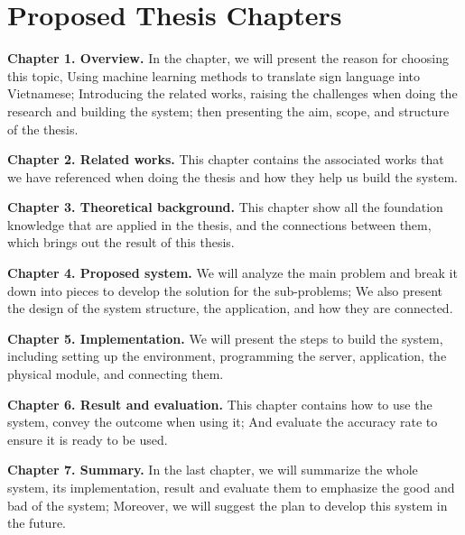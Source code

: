 \chapter{Proposed Thesis Chapters}

\textbf{Chapter 1. Overview.} In the chapter, we will present the reason for choosing this topic, Using machine learning methods to translate sign language into Vietnamese; Introducing the related works, raising the challenges when doing the research and building the system; then presenting the aim, scope, and structure of the thesis.

\textbf{Chapter 2. Related works.} This chapter contains the associated works that we have referenced when doing the thesis and how they help us build the system.

\textbf{Chapter 3. Theoretical background.} This chapter show all the foundation knowledge that are applied in the thesis, and the connections between them, which brings out the result of this thesis. 

\textbf{Chapter 4. Proposed system.} We will analyze the main problem and break it down into pieces to develop the solution for the sub-problems; We also present the design of the system structure, the application, and how they are connected.


\textbf{Chapter 5. Implementation.} We will present the steps to build the system, including setting up the environment, programming the server, application, the physical module, and connecting them.

\textbf{Chapter 6. Result and evaluation.} This chapter contains how to use the system, convey the outcome when using it; And evaluate the accuracy rate to ensure it is ready to be used.

\textbf{Chapter 7. Summary.} In the last chapter, we will summarize the whole system, its implementation, result and evaluate them to emphasize the good and bad of the system; Moreover, we will suggest the plan to develop this system in the future.
